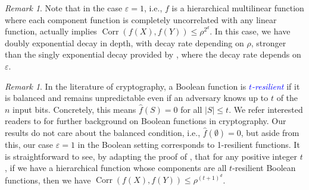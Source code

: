 \documentclass[12pt,letterpaper]{amsart}
\newcommand{\dfn}[1]{\textcolor{blue}{\emph{#1}}}
\def\Corr{\operatorname{Corr}}
\newcommand{\abs}[1]{\left\lvert#1\right\rvert}
\newcommand{\1}[1]{1_{\left\{#1\right\}}}
\theoremstyle{definition}
\theoremstyle{remark}
\newtheorem{remark}[theorem]{Remark}
\begin{document}
\begin{remark}\label{remark:multilinear_epsilon1}
    Note that in the case $\varepsilon=1$, i.e., $f$ is a hierarchical multilinear function where each component function is completely uncorrelated with any linear function,  actually implies $\Corr(f(X),f(Y))\leq\rho^{2^d}$.
    In this case, we have doubly exponential decay in depth, with decay rate depending on $\rho$, stronger than the singly exponential decay provided by , where the decay rate depends on $\varepsilon$.
\end{remark}
\begin{remark}\label{remark:multilinear_resilient}
    In the literature of cryptography, a Boolean function is \dfn{$t$-resilient} if it is balanced and remains unpredictable even if an adversary knows up to $t$ of the $n$ input bits.
    Concretely, this means $\widehat f(S)=0$ for all $\abs{S}\leq t$.
    We refer interested readers to \cite[Chapter 8]{CramaHammer} for further background on Boolean functions in cryptography.
    Our results do not care about the balanced condition, i.e., $\widehat f(\emptyset)=0$, but aside from this, our case $\varepsilon=1$ in the Boolean setting corresponds to 1-resilient functions.
    It is straightforward to see, by adapting the proof of , that for any positive integer $t$, if we have a hierarchical function whose components are all $t$-resilient Boolean functions, then we have $\Corr(f(X),f(Y))\leq\rho^{(t+1)^d}$.
\end{remark}
\end{document}
